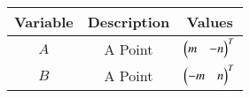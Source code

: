 \begin{center}
    \begin{tabular}{|c|c|c|} 
        \hline
            \textbf{Variable} & \textbf{Description} & \textbf{Values} \\ 
        \hline
            $A$ & A Point & $\begin{pmatrix}m & -n\end{pmatrix}^T$\\ 
        \hline
            $B$ & A Point & $\begin{pmatrix}-m & n\end{pmatrix}^T$\\ 
        \hline
    \end{tabular}
\end{center}  


